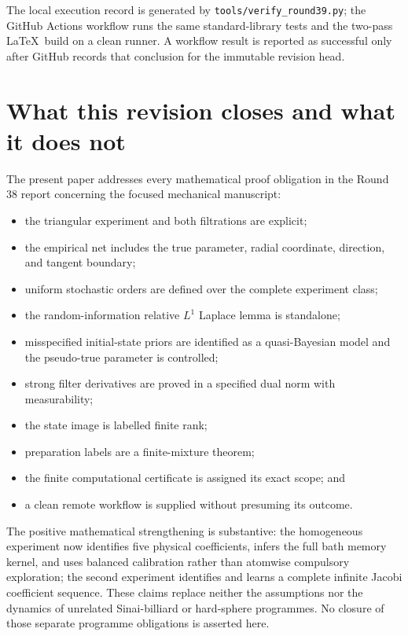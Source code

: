 The local execution record is generated by
\texttt{tools/verify\_round39.py}; the GitHub Actions workflow runs the same
standard-library tests and the two-pass \LaTeX\ build on a clean runner.  A
workflow result is reported as successful only after GitHub records that
conclusion for the immutable revision head.

\section{What this revision closes and what it does not}
\label{sec:scope}

The present paper addresses every mathematical proof obligation in the Round
38 report concerning the focused mechanical manuscript:
\begin{itemize}
\item the triangular experiment and both filtrations are explicit;
\item the empirical net includes the true parameter, radial coordinate,
direction, and tangent boundary;
\item uniform stochastic orders are defined over the complete experiment
class;
\item the random-information relative \(L^1\) Laplace lemma is standalone;
\item misspecified initial-state priors are identified as a quasi-Bayesian
model and the pseudo-true parameter is controlled;
\item strong filter derivatives are proved in a specified dual norm with
measurability;
\item the state image is labelled finite rank;
\item preparation labels are a finite-mixture theorem;
\item the finite computational certificate is assigned its exact scope; and
\item a clean remote workflow is supplied without presuming its outcome.
\end{itemize}

The positive mathematical strengthening is substantive: the homogeneous
experiment now identifies five physical coefficients, infers the full bath
memory kernel, and uses balanced calibration rather than atomwise compulsory
exploration; the second experiment identifies and learns a complete infinite
Jacobi coefficient sequence.  These claims replace neither the assumptions
nor the dynamics of unrelated Sinai-billiard or hard-sphere programmes.  No
closure of those separate programme obligations is asserted here.
